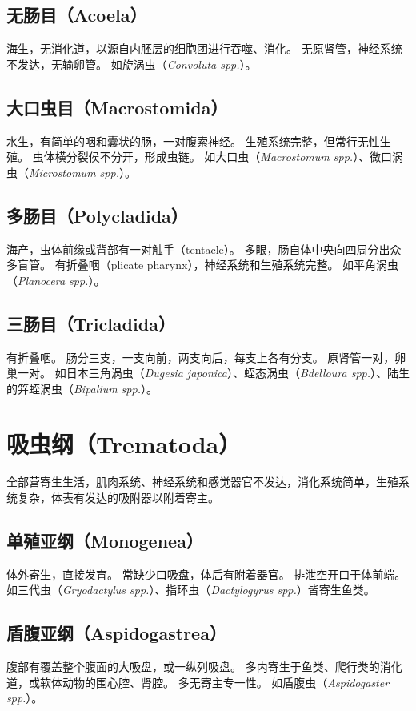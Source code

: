 \documentclass[11pt]{article}
\begin{document}
\subsection{无肠目（Acoela）}
海生，无消化道，以源自内胚层的细胞团进行吞噬、消化。
无原肾管，神经系统不发达，无输卵管。
如旋涡虫（\textit{Convoluta spp.}）。

\subsection{大口虫目（Macrostomida）}
水生，有简单的咽和囊状的肠，一对腹索神经。
生殖系统完整，但常行无性生殖。
虫体横分裂侯不分开，形成虫链。
如大口虫（\textit{Macrostomum spp.}）、微口涡虫（\textit{Microstomum spp.}）。

\subsection{多肠目（Polycladida）}
海产，虫体前缘或背部有一对触手（tentacle）。
多眼，肠自体中央向四周分出众多盲管。
有折叠咽（plicate pharynx），神经系统和生殖系统完整。
如平角涡虫（\textit{Planocera spp.}）。

\subsection{三肠目（Tricladida）}
有折叠咽。
肠分三支，一支向前，两支向后，每支上各有分支。
原肾管一对，卵巢一对。
如日本三角涡虫（\textit{Dugesia japonica}）、蛭态涡虫（\textit{Bdelloura spp.}）、陆生的笄蛭涡虫（\textit{Bipalium spp.}）。

\section{吸虫纲（Trematoda）}
全部营寄生生活，肌肉系统、神经系统和感觉器官不发达，消化系统简单，生殖系统复杂，体表有发达的吸附器以附着寄主。

\subsection{单殖亚纲（Monogenea）}
体外寄生，直接发育。
常缺少口吸盘，体后有附着器官。
排泄空开口于体前端。
如三代虫（\textit{Gryodactylus spp.}）、指环虫（\textit{Dactylogyrus spp.}）皆寄生鱼类。

\subsection{盾腹亚纲（Aspidogastrea）}
腹部有覆盖整个腹面的大吸盘，或一纵列吸盘。
多内寄生于鱼类、爬行类的消化道，或软体动物的围心腔、肾腔。
多无寄主专一性。
如盾腹虫（\textit{Aspidogaster spp.}）。
\end{document}
